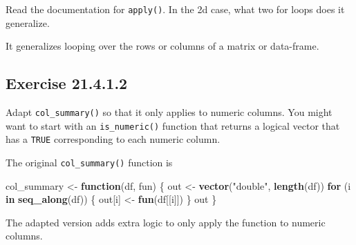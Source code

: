 \documentclass[]{book}
\newenvironment{Shaded}{\begin{snugshade}}{\end{snugshade}}
\newcommand{\ControlFlowTok}[1]{\textcolor[rgb]{0.13,0.29,0.53}{\textbf{#1}}}
\newcommand{\KeywordTok}[1]{\textcolor[rgb]{0.13,0.29,0.53}{\textbf{#1}}}
\newcommand{\NormalTok}[1]{#1}
\newcommand{\StringTok}[1]{\textcolor[rgb]{0.31,0.60,0.02}{#1}}
\theoremstyle{plain}
\theoremstyle{remark}
\begin{document}
Read the documentation for \texttt{apply()}. In the 2d case, what two for loops does it generalize.

It generalizes looping over the rows or columns of a matrix or data-frame.

\hypertarget{exercise-21.4.1.2}{%
\subsection*{\texorpdfstring{Exercise {21.4.1.2}}{Exercise 21.4.1.2}}\label{exercise-21.4.1.2}}

Adapt \texttt{col\_summary()} so that it only applies to numeric columns.
You might want to start with an \texttt{is\_numeric()} function that returns a logical vector that has a \texttt{TRUE} corresponding to each numeric column.

The original \texttt{col\_summary()} function is

\begin{Shaded}
\begin{Highlighting}[]
\NormalTok{col_summary <-}\StringTok{ }\ControlFlowTok{function}\NormalTok{(df, fun) \{}
\NormalTok{  out <-}\StringTok{ }\KeywordTok{vector}\NormalTok{(}\StringTok{"double"}\NormalTok{, }\KeywordTok{length}\NormalTok{(df))}
  \ControlFlowTok{for}\NormalTok{ (i }\ControlFlowTok{in} \KeywordTok{seq_along}\NormalTok{(df)) \{}
\NormalTok{    out[i] <-}\StringTok{ }\KeywordTok{fun}\NormalTok{(df[[i]])}
\NormalTok{  \}}
\NormalTok{  out}
\NormalTok{\}}
\end{Highlighting}
\end{Shaded}

The adapted version adds extra logic to only apply the function to numeric
columns.
\end{document}
